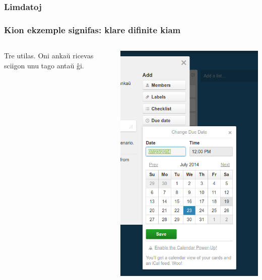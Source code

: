   \begin{frame}
    \frametitle{Limdatoj}
    \frametitle{Kion ekzemple signifas: klare difinite kiam}

    \begin{columns}
    
    Tre utilas. Oni ankaŭ ricevas sciigon unu tago antaŭ ĝi.
        	
    
    \includegraphics[scale=0.2]{ekranoj/limdato}
	
	\end{columns}
	
	
	
  \end{frame}


